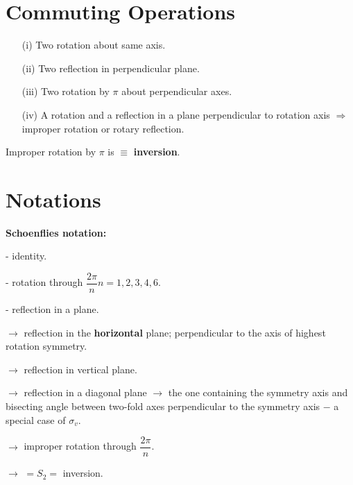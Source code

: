\section*{Commuting Operations}
\begin{itemize}
\itemsep=0pt
\item[(i)] Two rotation about same axis.

\item[(ii)] Two reflection in perpendicular plane.

\item[(iii)] Two rotation by $\pi$ about perpendicular axes.

\item[(iv)] A rotation and a reflection in a plane perpendicular to rotation axis $\Rightarrow$ improper rotation or rotary reflection.
\end{itemize}
Improper rotation by $\pi$ is $\equiv$ {\bf inversion}.

\section*{Notations}

\noindent
{\bf Schoenflies notation:}
\begin{description}
\itemsep=0pt
\item[$E$] - identity.

\item[$C_{n}$] - rotation through $\dfrac{2\pi}{n}$\quad $n=1,2,3,4,6$.

\item[$\sigma$] - reflection in a plane.

\item[$\sigma_{h}$] $\to$ reflection in the {\bf horizontal} plane; perpendicular to the axis of highest rotation symmetry.

\item[$\sigma_{v}$] $\to$ reflection in vertical plane.

\item[$\sigma_{d}$] $\to$ reflection in a diagonal plane $\to$ the one containing the symmetry axis and bisecting angle between two-fold axes perpendicular to the symmetry axis $-$ a special case of $\sigma_{v}$.

\item[$S_{n}$] $\to$ improper rotation through $\dfrac{2\pi}{n}$.

\item[$i$] $\to$ $=S_{2}=$ inversion.
\end{description}


